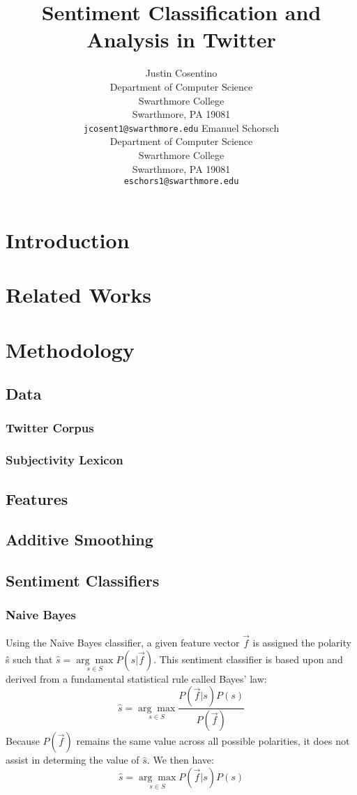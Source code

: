\documentclass[11pt]{article}
\title{Sentiment Classification and Analysis in Twitter}
\author{Justin Cosentino\\
  Department of Computer Science\\
  Swarthmore College\\
  Swarthmore, PA 19081\\
  {\tt jcosent1@swarthmore.edu}  
  \And                            
  Emanuel Schorsch\\                 
  Department of Computer Science\\
  Swarthmore College\\
  Swarthmore, PA 19081\\
  {\tt eschors1@swarthmore.edu}}
\date{}
\begin{document}
\maketitle
\begin{abstract}
\end{abstract}

\section{Introduction}

\section{Related Works}

\section{Methodology}

\subsection{Data}
\subsubsection{Twitter Corpus}
\subsubsection{Subjectivity Lexicon}

\subsection{Features}
\subsection{Additive Smoothing}

\subsection{Sentiment Classifiers}
\subsubsection{Naive Bayes}
Using the Naive Bayes classifier, a given feature vector $\vec{f}$ is assigned
the polarity \^{s} such that 
$\hat{s} = \underset{{s}\in{S}}{\arg\max}P(s|\vec{f})$. This sentiment 
classifier is based upon and derived from a fundamental statistical rule 
called Bayes' law:
\[\hat{s} = \underset{{s}\in{S}}{\arg\max}{\frac{P(\vec{f}|s)P(s)}{P(\vec{f})}}\]
Because $P(\vec{f})$ remains the same value across all possible polarities, it
does not assist in determing the value of $\hat{s}$. We then have:
\[\hat{s} = \underset{{s}\in{S}}{\arg\max}{P(\vec{f}|s)P(s)}\]
\end{document}
